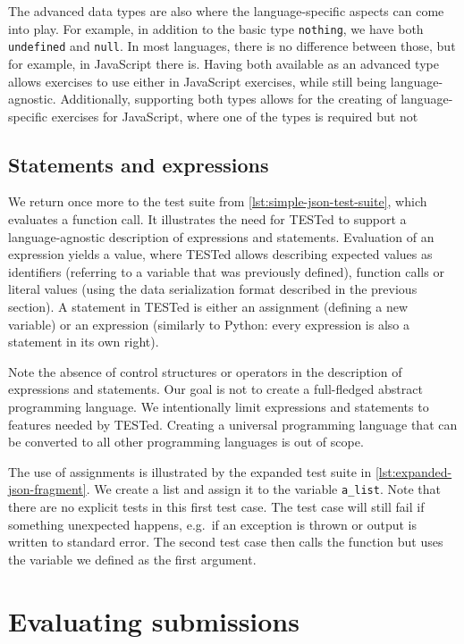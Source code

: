 \documentclass[../main]{subfiles}
\begin{document}
The advanced data types are also where the language-specific aspects can come into play.
For example, in addition to the basic type \texttt{nothing}, we have both \texttt{undefined} and \texttt{null}.
In most languages, there is no difference between those, but for example, in JavaScript there is.
Having both available as an advanced type allows exercises to use either in JavaScript exercises, while still being language-agnostic.
Additionally, supporting both types allows for the creating of language-specific exercises for JavaScript, where one of the types is required but not

\subsection{Statements and expressions}\label{subsec:tested1-statements-and-expressions}

We return once more to the test suite from \cref{lst:simple-json-test-suite}, which evaluates a function call.
It illustrates the need for TESTed to support a language-agnostic description of expressions and statements.
Evaluation of an expression yields a value, where TESTed allows describing expected values as identifiers (referring to a variable that was previously defined), function calls or literal values (using the data serialization format described in the previous section).
A statement in TESTed is either an assignment (defining a new variable) or an expression (similarly to Python: every expression is also a statement in its own right).

Note the absence of control structures or operators in the description of expressions and statements.
Our goal is not to create a full-fledged abstract programming language.
We intentionally limit expressions and statements to features needed by TESTed.
Creating a universal programming language that can be converted to all other programming languages is out of scope.

The use of assignments is illustrated by the expanded test suite in \cref{lst:expanded-json-fragment}.
We create a list and assign it to the variable \texttt{a\_list}.
Note that there are no explicit tests in this first test case.
The test case will still fail if something unexpected happens, e.g.\ if an exception is thrown or output is written to standard error.
The second test case then calls the function but uses the variable we defined as the first argument.

\section{Evaluating submissions}\label{sec:tested1-evaluating-submissions}
\end{document}
